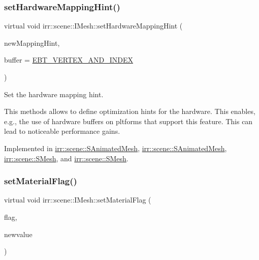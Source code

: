 \subsubsection{\texorpdfstring{set\+Hardware\+Mapping\+Hint()}{setHardwareMappingHint()}\hspace{0.1cm}{\footnotesize\ttfamily [2/2]}}
{\footnotesize\ttfamily virtual void irr\+::scene\+::\+I\+Mesh\+::set\+Hardware\+Mapping\+Hint (\begin{DoxyParamCaption}\item[{\hyperlink{namespaceirr_1_1scene_ac7d8ee8d77da75f2580bb9bb17231c27}{E\+\_\+\+H\+A\+R\+D\+W\+A\+R\+E\+\_\+\+M\+A\+P\+P\+I\+NG}}]{new\+Mapping\+Hint,  }\item[{\hyperlink{namespaceirr_1_1scene_a8f59a89ffef0ad8e5b2c2cb874a93e8c}{E\+\_\+\+B\+U\+F\+F\+E\+R\+\_\+\+T\+Y\+PE}}]{buffer = {\ttfamily \hyperlink{namespaceirr_1_1scene_a8f59a89ffef0ad8e5b2c2cb874a93e8ca34ea664123fbc28610408e51b014dcdd}{E\+B\+T\+\_\+\+V\+E\+R\+T\+E\+X\+\_\+\+A\+N\+D\+\_\+\+I\+N\+D\+EX}} }\end{DoxyParamCaption})\hspace{0.3cm}{\ttfamily [pure virtual]}}



Set the hardware mapping hint. 

This methods allows to define optimization hints for the hardware. This enables, e.\+g., the use of hardware buffers on pltforms that support this feature. This can lead to noticeable performance gains. 

Implemented in \hyperlink{structirr_1_1scene_1_1SAnimatedMesh_a69448fa91bd1c6316d11d9ae3b8b88e6}{irr\+::scene\+::\+S\+Animated\+Mesh}, \hyperlink{structirr_1_1scene_1_1SAnimatedMesh_a69448fa91bd1c6316d11d9ae3b8b88e6}{irr\+::scene\+::\+S\+Animated\+Mesh}, \hyperlink{structirr_1_1scene_1_1SMesh_a79839b08062bfcd283e441056bf846e6}{irr\+::scene\+::\+S\+Mesh}, and \hyperlink{structirr_1_1scene_1_1SMesh_a79839b08062bfcd283e441056bf846e6}{irr\+::scene\+::\+S\+Mesh}.

\mbox{\label{classirr_1_1scene_1_1IMesh_a56e034b671f52653d6c91e0ffa42febd}} 
\subsubsection{\texorpdfstring{set\+Material\+Flag()}{setMaterialFlag()}\hspace{0.1cm}{\footnotesize\ttfamily [1/2]}}
{\footnotesize\ttfamily virtual void irr\+::scene\+::\+I\+Mesh\+::set\+Material\+Flag (\begin{DoxyParamCaption}\item[{\hyperlink{namespaceirr_1_1video_a8a3bc00ae8137535b9fbc5f40add70d3}{video\+::\+E\+\_\+\+M\+A\+T\+E\+R\+I\+A\+L\+\_\+\+F\+L\+AG}}]{flag,  }\item[{bool}]{newvalue }\end{DoxyParamCaption})\hspace{0.3cm}{\ttfamily [pure virtual]}}



